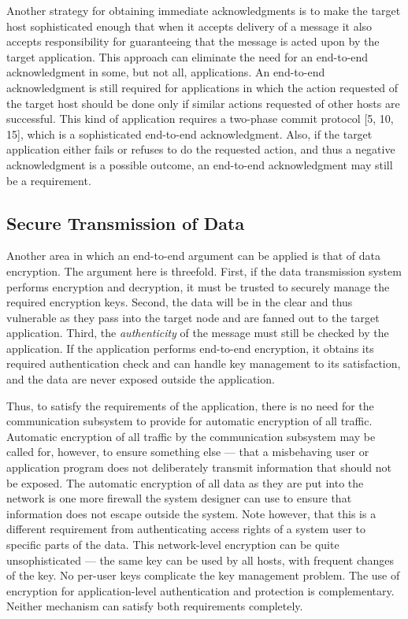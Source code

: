 \documentclass[a4paper,11pt,notitlepage,twoside,openright]{article}
\begin{document}
Another strategy for obtaining immediate acknowledgments is to make the
target host sophisticated enough that when it accepts delivery of a
message it also accepts responsibility for guaranteeing that the message
is acted upon by the target application. This approach can eliminate the
need for an end-to-end acknowledgment in some, but not all,
applications. An end-to-end acknowledgment is still required for
applications in which the action requested of the target host should be
done only if similar actions requested of other hosts are successful.
This kind of application requires a two-phase commit protocol {[}5, 10,
15{]}, which is a sophisticated end-to-end acknowledgment. Also, if the
target application either fails or refuses to do the requested action,
and thus a negative acknowledgment is a possible outcome, an end-to-end
acknowledgment may still be a requirement.

\hypertarget{secure-transmission-of-data}{%
\subsection{Secure Transmission of
Data}\label{secure-transmission-of-data}}

Another area in which an end-to-end argument can be applied is that of
data encryption. The argument here is threefold. First, if the data
transmission system performs encryption and decryption, it must be
trusted to securely manage the required encryption keys. Second, the
data will be in the clear and thus vulnerable
as they pass into the target node and are fanned out to the target
application. Third, the \emph{authenticity} of the message must still be
checked by the application. If the application performs end-to-end
encryption, it obtains its required authentication check and can handle
key management to its satisfaction, and the data are never exposed
outside the application.

Thus, to satisfy the requirements of the application, there is no need
for the communication subsystem to provide for automatic encryption of
all traffic. Automatic encryption of all traffic by the communication
subsystem may be called for, however, to ensure something else --- that a misbehaving user or application program does not deliberately
transmit information that should not be exposed. The automatic
encryption of all data as they are put into the network is one more
firewall the system designer can use to ensure that information does not
escape outside the system. Note however, that this is a different
requirement from authenticating access rights of a system user to
specific parts of the data. This network-level encryption can be quite
unsophisticated --- the same key can be used by all hosts, with
frequent changes of the key. No per-user keys complicate the key
management problem. The use of encryption for application-level
authentication and protection is complementary. Neither mechanism can
satisfy both requirements completely.
\end{document}
